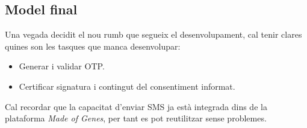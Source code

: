 \subsection{Model final}
Una vegada decidit el nou rumb que segueix el desenvolupament, cal tenir clares quines son les tasques que manca desenvolupar:
\begin{itemize}
    \item Generar i validar OTP.
    \item Certificar signatura i contingut del consentiment informat.
\end{itemize}
Cal recordar que la capacitat d'enviar SMS ja està integrada dins de la plataforma \textit{Made of Genes}, per tant es pot reutilitzar sense problemes.
